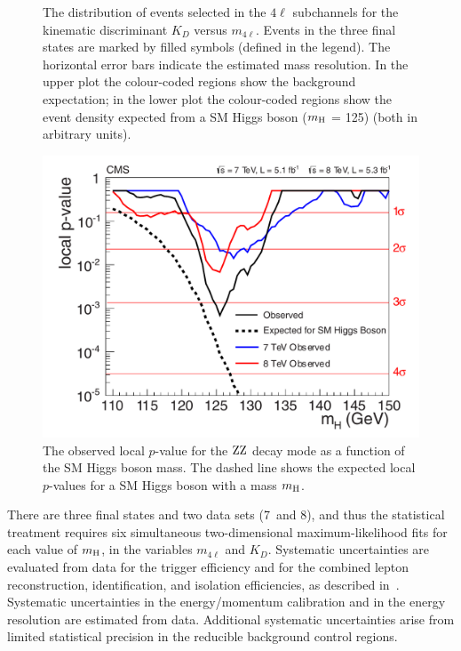 \documentclass[11pt,twoside,a4paper,cmspaper,final]{cms-tdr}
\begin{document}
\begin{figure}[htbp]
\begin{center}
    \caption{\label{fig:ZZmela} The distribution of events
selected in the $4\ell$ subchannels for the kinematic discriminant $K_{D}$ versus $m_{4\ell}$.
Events in the three final states are marked by filled symbols (defined in the legend).
The horizontal error bars indicate the estimated mass resolution.
In the upper plot the colour-coded regions show the background expectation;
in the lower plot the colour-coded regions show the event density expected from a SM Higgs boson ($m_{\mathrm{H}}$ = 125\GeV)
(both in arbitrary units).
}
   \end{center}
\end{figure}


\begin{figure} [htbp]
\begin{center}
\includegraphics[width=\cmsFigWideWidth]{Pvals_PLP_lowMass_2D_forSMPaper_7p8sep}
\caption{
The observed local $p$-value for the $\mathrm{Z}\mathrm{Z}$ decay mode as a function of the SM Higgs
boson mass.
The dashed line shows the expected local $p$-values
for a SM Higgs boson with a mass $m_{\mathrm{H}}$.
}
\label{fig:pvalue_ZZ}
\end{center}
\end{figure}

There are three final states and two data sets (7~and
8\TeV), and thus the statistical treatment requires
six simultaneous two-dimensional maximum-likelihood fits for each value
of $m_{\mathrm{H}}$, in the variables ${m}_{4\ell}$ and $K_{D}$.
Systematic uncertainties are evaluated from data for the trigger efficiency
and for the combined lepton reconstruction, identification, and isolation efficiencies, as described in~\cite{CMS:2011aa}.
Systematic uncertainties in the energy/momentum calibration
and in the energy resolution are estimated from data.
Additional systematic uncertainties arise from limited statistical precision in the reducible
background control regions.
\end{document}
